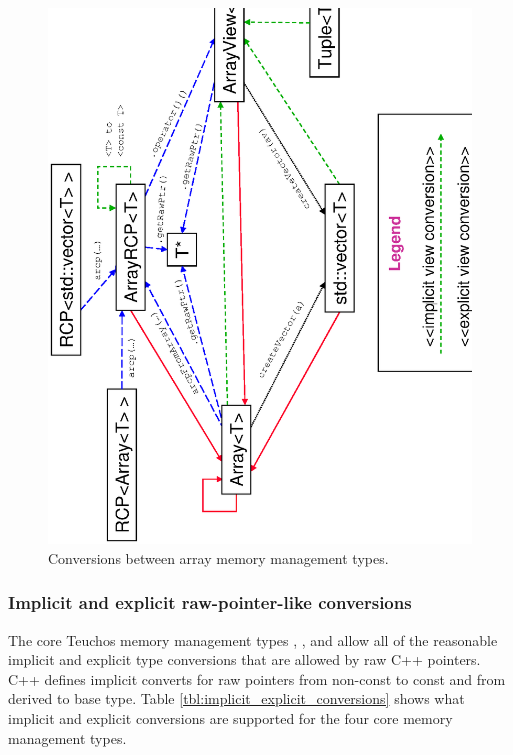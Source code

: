 \documentclass[pdf,ps2pdf,11pt]{SANDreport}
\begin{document}
{\bsinglespace
\begin{figure}[p]
\begin{center}
\includegraphics*[angle=270,scale=0.50]{TeuchosArrayConversions}
\end{center}
\caption{
\label{fig:TeuchosArrayConversions}
Conversions between array memory management types.  }
\end{figure}
\esinglespace}


%
{}\subsubsection{Implicit and explicit raw-pointer-like conversions}
\label{sec:raw-pointer-like-type-conversions}
%

The core Teuchos memory management types {},
{}, {} and {} allow all
of the reasonable implicit and explicit type conversions that are
allowed by raw C++ pointers.  C++ defines implicit converts for raw
pointers from non-const to const and from derived to base type.  Table
{}\ref{tbl:implicit_explicit_conversions} shows what implicit and
explicit conversions are supported for the four core memory management
types.
\end{document}
